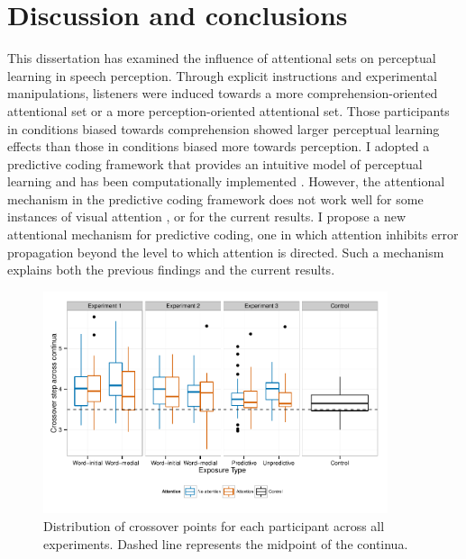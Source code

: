 
\chapter{Discussion and conclusions}
\label{chap:conclusion}

This dissertation has examined the influence of attentional sets on perceptual learning in speech perception.
Through explicit instructions and experimental manipulations, listeners were induced towards a more comprehension-oriented attentional set or a more perception-oriented attentional set.
Those participants in conditions biased towards comprehension showed larger perceptual learning effects than those in conditions biased more towards perception.
I adopted a predictive coding framework \citep{Clark2013} that provides an intuitive model of perceptual learning and has been computationally implemented \citep{Kleinschmidt2011}.
However, the attentional mechanism in the predictive coding framework does not work well for some instances of visual attention \citep{Block2013}, or for the current results.
I propose a new attentional mechanism for predictive coding, one in which attention inhibits error propagation beyond the level to which attention is directed.  Such a mechanism explains both the previous findings and the current results.

\begin{figure}[!ht]
\centering
\caption{Distribution of crossover points for each participant across all experiments.  Dashed line represents the midpoint of the continua.}
\label{fig:exp123xoverdist}
\begin{center}
\includegraphics[width=0.9\textwidth]{graphs/exp123_xoverdist}
\end{center}
\end{figure}


